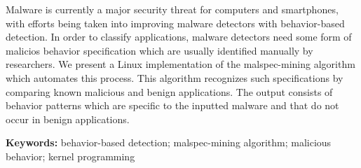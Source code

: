 
Malware is currently a major security threat for computers and smartphones, with efforts being taken into improving malware detectors with behavior-based detection. In order to classify applications, malware detectors need some form of malicios behavior specification which are usually identified manually by researchers. We present a Linux implementation of the malspec-mining algorithm which automates this process. This algorithm recognizes such specifications by comparing known malicious and benign applications. The output consists of behavior patterns which are specific to the inputted malware and that do not occur in benign applications.

\textbf{Keywords:} behavior-based detection; malspec-mining algorithm; malicious behavior; kernel programming
